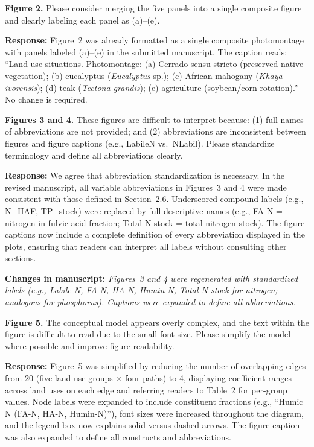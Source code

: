 \documentclass[11pt,a4paper]{article}
\newcommand{\response}[1]{\par\noindent\textcolor{responsecolor}{\textbf{Response:}} #1}
\newcommand{\change}[1]{\par\noindent\textcolor{changecolor}{\textbf{Changes in manuscript:}} \textit{#1}}
\begin{document}
\begin{reviewerbox}
\textbf{Figure 2.} Please consider merging the five panels into a single composite figure and clearly labeling each panel as (a)--(e).
\end{reviewerbox}

\response{Figure~2 was already formatted as a single composite photomontage with panels labeled (a)--(e) in the submitted manuscript. The caption reads: ``Land-use situations. Photomontage: (a) Cerrado sensu stricto (preserved native vegetation); (b) eucalyptus (\textit{Eucalyptus} sp.); (c) African mahogany (\textit{Khaya ivorensis}); (d) teak (\textit{Tectona grandis}); (e) agriculture (soybean/corn rotation).'' No change is required.}

\bigskip

\begin{reviewerbox}
\textbf{Figures 3 and 4.} These figures are difficult to interpret because: (1) full names of abbreviations are not provided; and (2) abbreviations are inconsistent between figures and figure captions (e.g., LabileN vs.\ NLabil). Please standardize terminology and define all abbreviations clearly.
\end{reviewerbox}

\response{We agree that abbreviation standardization is necessary. In the revised manuscript, all variable abbreviations in Figures~3 and 4 were made consistent with those defined in Section~2.6. Underscored compound labels (e.g., N\_HAF, TP\_stock) were replaced by full descriptive names (e.g., FA-N = nitrogen in fulvic acid fraction; Total N stock = total nitrogen stock). The figure captions now include a complete definition of every abbreviation displayed in the plots, ensuring that readers can interpret all labels without consulting other sections.}

\change{Figures~3 and 4 were regenerated with standardized labels (e.g., Labile N, FA-N, HA-N, Humin-N, Total N stock for nitrogen; analogous for phosphorus). Captions were expanded to define all abbreviations.}

\bigskip

\begin{reviewerbox}
\textbf{Figure 5.} The conceptual model appears overly complex, and the text within the figure is difficult to read due to the small font size. Please simplify the model where possible and improve figure readability.
\end{reviewerbox}

\response{Figure~5 was simplified by reducing the number of overlapping edges from 20 (five land-use groups $\times$ four paths) to 4, displaying coefficient ranges across land uses on each edge and referring readers to Table~2 for per-group values. Node labels were expanded to include constituent fractions (e.g., ``Humic N (FA-N, HA-N, Humin-N)''), font sizes were increased throughout the diagram, and the legend box now explains solid versus dashed arrows. The figure caption was also expanded to define all constructs and abbreviations.}
\end{document}
